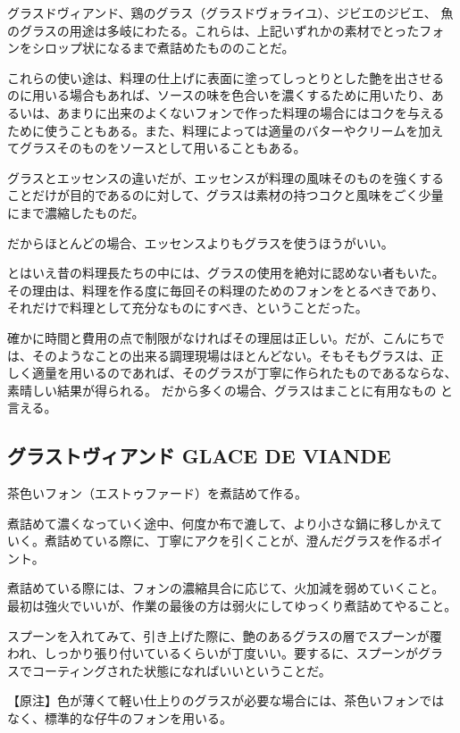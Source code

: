 \documentclass[twoside,12Q,b5paper]{escoffierltjsbook}
\begin{document}
グラスドヴィアンド、鶏のグラス（グラスドヴォライユ）、ジビエのジビエ、
魚のグラスの用途は多岐にわたる。これらは、上記いずれかの素材でとったフォ
ンをシロップ状になるまで煮詰めたもののことだ。

これらの使い途は、料理の仕上げに表面に塗ってしっとりとした艶を出させる
のに用いる場合もあれば、ソースの味を色合いを濃くするために用いたり、あ
るいは、あまりに出来のよくないフォンで作った料理の場合にはコクを与える
ために使うこともある。また、料理によっては適量のバターやクリームを加え
てグラスそのものをソースとして用いることもある。

グラスとエッセンスの違いだが、エッセンスが料理の風味そのものを強くする
ことだけが目的であるのに対して、グラスは素材の持つコクと風味をごく少量
にまで濃縮したものだ。

だからほとんどの場合、エッセンスよりもグラスを使うほうがいい。

とはいえ昔の料理長たちの中には、グラスの使用を絶対に認めない者もいた。
その理由は、料理を作る度に毎回その料理のためのフォンをとるべきであり、
それだけで料理として充分なものにすべき、ということだった。

確かに時間と費用の点で制限がなければその理屈は正しい。だが、こんにちで
は、そのようなことの出来る調理現場はほとんどない。そもそもグラスは、正
しく適量を用いるのであれば、そのグラスが丁寧に作られたものであるならな、
素晴しい結果が得られる。 だから多くの場合、グラスはまことに有用なもの
と言える。

\subsection*{グラストヴィアンド GLACE DE
VIANDE}\label{ux30b0ux30e9ux30b9ux30c8ux30f4ux30a3ux30a2ux30f3ux30c9-glace-de-viande}

茶色いフォン（エストゥファード）を煮詰めて作る。

煮詰めて濃くなっていく途中、何度か布で漉して、より小さな鍋に移しかえて
いく。煮詰めている際に、丁寧にアクを引くことが、澄んだグラスを作るポイ
ント。

煮詰めている際には、フォンの濃縮具合に応じて、火加減を弱めていくこと。
最初は強火でいいが、作業の最後の方は弱火にしてゆっくり煮詰めてやること。

スプーンを入れてみて、引き上げた際に、艶のあるグラスの層でスプーンが覆
われ、しっかり張り付いているくらいが丁度いい。要するに、スプーンがグラ
スでコーティングされた状態になればいいということだ。

【原注】色が薄くて軽い仕上りのグラスが必要な場合には、茶色いフォンでは
なく、標準的な仔牛のフォンを用いる。
\end{document}
